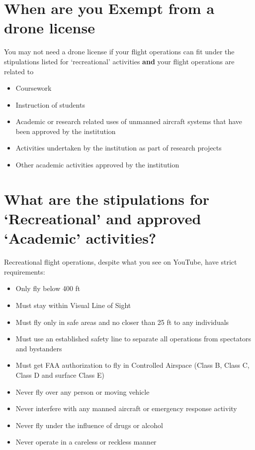 \documentclass[
]{book}
\providecommand{\tightlist}{%
  \setlength{\itemsep}{0pt}\setlength{\parskip}{0pt}}
\begin{document}
\hypertarget{when-are-you-exempt-from-a-drone-license}{%
\section{When are you Exempt from a drone license}\label{when-are-you-exempt-from-a-drone-license}}

You may not need a drone license if your flight operations can fit under the stipulations listed for `recreational' activities \textbf{and} your flight operations are related to

\begin{itemize}
\tightlist
\item
  Coursework
\item
  Instruction of students
\item
  Academic or research related uses of unmanned aircraft systems that have been approved by the institution
\item
  Activities undertaken by the institution as part of research projects
\item
  Other academic activities approved by the institution
\end{itemize}

\hypertarget{what-are-the-stipulations-for-recreational-and-approved-academic-activities}{%
\section{What are the stipulations for `Recreational' and approved `Academic' activities?}\label{what-are-the-stipulations-for-recreational-and-approved-academic-activities}}

Recreational flight operations, despite what you see on YouTube, have strict requirements:

\begin{itemize}
\tightlist
\item
  Only fly below 400 ft
\item
  Must stay within Visual Line of Sight
\item
  Must fly only in safe areas and no closer than 25 ft to any individuals
\item
  Must use an established safety line to separate all operations from spectators and bystanders
\item
  Must get FAA authorization to fly in Controlled Airspace (Class B, Class C, Class D and surface Class E)
\item
  Never fly over any person or moving vehicle
\item
  Never interfere with any manned aircraft or emergency response activity
\item
  Never fly under the influence of drugs or alcohol
\item
  Never operate in a careless or reckless manner
\end{itemize}
\end{document}
